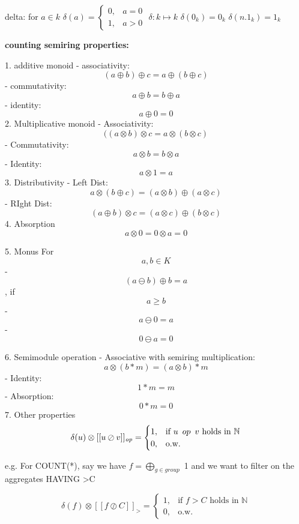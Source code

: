 delta: 
for $a \in k$
$\delta(a) = \begin{cases} 0, & a=0\\ 1, & a>0 \end{cases}$
$\delta:k \mapsto k $
$\delta(0_k)=0_k$
$\delta(n.1_k)=1_k$


\textbf{counting semiring properties:}

1. additive monoid
- associativity: $$(a \oplus b) \oplus c = a \oplus (b\oplus c)$$
- commutativity: $$a \oplus b = b \oplus a$$
- identity: $$a \oplus 0 = 0$$
2. Multiplicative monoid
- Associativity: $$( (a \otimes b) \otimes c = a \otimes (b\otimes c)$$
- Commutativity: $$a \otimes b = b \otimes a$$
- Identity: $$a \otimes 1 = a$$
3. Distributivity
- Left Dist: $$a \otimes (b \oplus c)= (a \otimes b)\oplus(a \otimes c)$$
- RIght Dist: $$(a \oplus b)\otimes c=(a \otimes c)\oplus(b \otimes c)$$
 4. Absorption
$$a \otimes 0 = 0 \otimes a = 0$$

5. Monus \newline
For $$a, b \in K$$
- $$(a \ominus b) \oplus b =a$$, if $$a \geq b$$
- $$a \ominus 0 =a$$
- $$0 \ominus a = 0$$

6. Semimodule operation
- Associative with semiring multiplication: $$a \otimes (b * m)= (a \otimes b) * m$$
- Identity: $$1*m=m$$
- Absorption: $$0*m=0$$
7. Other properties
$$
 \delta(u)\otimes[[u \oslash   v]]_{\mathit{op}}=\begin{cases}1, & \text{if } u\hspace{0.5em} op\hspace{0.5em} v \text{ holds in } \mathbb{N} \\
0,&\text{o.w.}\end{cases}
$$

e.g. For COUNT(*), say we have $f=\bigoplus_{g \in group}$ 1 and we want to filter on the aggregates HAVING >C

$$
 \delta(f)\otimes[[f \oslash   C]]_{\mathit{>}}=\begin{cases}1, & \text{if } f>C \text{ holds in } \mathbb{N} \\
0,&\text{o.w.}\end{cases}
$$


